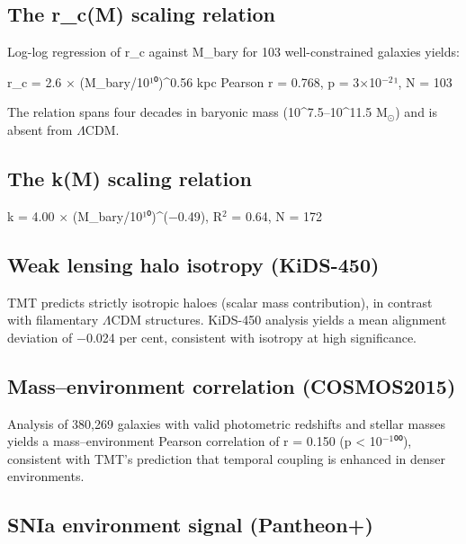 \documentclass[a4paper,fleqn,usenatbib]{mnras}
\begin{document}
\subsection{The r\_c(M) scaling relation}\label{sec:4-2-the-r-c-m-scaling-relation}

Log-log regression of r_c against M_bary for 103 well-constrained galaxies yields:

    r_c = 2.6 $\times$ (M_bary/10¹⁰)^0.56 kpc
    Pearson r = 0.768,  p = 3$\times$10$^{-2}$¹,  N = 103

The relation spans four decades in baryonic mass (10^7.5–10^11.5 M$_\odot$) and is absent from $\Lambda$CDM.


\subsection{The k(M) scaling relation}\label{sec:4-3-the-k-m-scaling-relation}

    k = 4.00 $\times$ (M_bary/10¹⁰)^(−0.49),   R$^{2}$ = 0.64,  N = 172


\subsection{Weak lensing halo isotropy (KiDS-450)}\label{sec:4-4-weak-lensing-halo-isotropy-kids-450}

TMT predicts strictly isotropic haloes (scalar mass contribution), in contrast with filamentary $\Lambda$CDM structures. KiDS-450 analysis yields a mean alignment deviation of −0.024 per cent, consistent with isotropy at high significance.


\subsection{Mass–environment correlation (COSMOS2015)}\label{sec:4-5-mass-environment-correlation-cosmos2015}

Analysis of 380,269 galaxies with valid photometric redshifts and stellar masses yields a mass–environment Pearson correlation of r = 0.150 (p < 10$^{-1}$⁰⁰), consistent with TMT's prediction that temporal coupling is enhanced in denser environments.


\subsection{SNIa environment signal (Pantheon+)}\label{sec:4-6-snia-environment-signal-pantheon}
\end{document}
